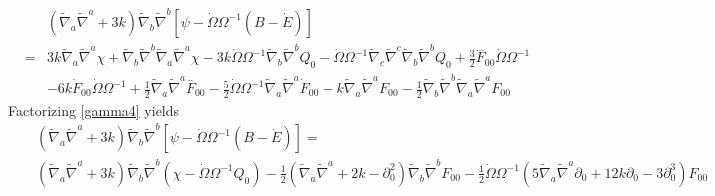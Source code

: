 \documentclass[10pt,letterpaper]{article}
\numberwithin{equation}{section}
\begin{document}
\begin{eqnarray}
&&(\tilde\nabla_a\tilde\nabla^a + 3k)\tilde\nabla_b\tilde\nabla^b[ \psi-\dot \Omega \Omega^{-1}(B-\dot E)]
\nonumber\\
&=& 3 k \tilde{\nabla}_{a}\tilde{\nabla}^{a}\chi + \tilde{\nabla}_{b}\tilde{\nabla}^{b}\tilde{\nabla}_{a}\tilde{\nabla}^{a}\chi -3 k \dot{\Omega} \Omega^{-1} \tilde{\nabla}_{b}\tilde{\nabla}^{b}Q_0 -  \dot{\Omega} \Omega^{-1} \tilde{\nabla}_{c}\tilde{\nabla}^{c}\tilde{\nabla}_{b}\tilde{\nabla}^{b}Q_0+\tfrac{3}{2} \overset{...}{F}_{00}{} \dot{\Omega} \Omega^{-1} \nonumber \\ 
&& - 6 k \dot{F}_{00}{} \dot{\Omega} \Omega^{-1} + \tfrac{1}{2} \tilde{\nabla}_{a}\tilde{\nabla}^{a}\overset{..}{F}_{00}{} -  \tfrac{5}{2} \dot{\Omega} \Omega^{-1} \tilde{\nabla}_{a}\tilde{\nabla}^{a}\dot{F}_{00}{} -  k \tilde{\nabla}_{a}\tilde{\nabla}^{a}F_{00}{} -  \tfrac{1}{2} \tilde{\nabla}_{b}\tilde{\nabla}^{b}\tilde{\nabla}_{a}\tilde{\nabla}^{a}F_{00}{}
\label{gamma4}
\end{eqnarray}
Factorizing \eqref{gamma4} yields 
\begin{eqnarray}
&&(\tilde\nabla_a\tilde\nabla^a + 3k)\tilde\nabla_b\tilde\nabla^b[ \psi-\dot \Omega \Omega^{-1}(B-\dot E)] =
\nonumber\\
&&(\tilde\nabla_a\tilde\nabla^a + 3k)\tilde\nabla_b\tilde\nabla^b(\chi - \dot\Omega \Omega^{-1} Q_0)
-\tfrac12 \left( \tilde\nabla_a\tilde\nabla^a +2k - \partial_0^2\right) \tilde\nabla_b\tilde\nabla^b F_{00}
-\tfrac12 \dot\Omega\Omega^{-1}\left( 5\tilde\nabla_a\tilde\nabla^a\partial_0 + 12k \partial_0 -3\partial_0^3\right)F_{00}
\nonumber\\
\phantom{}
\end{eqnarray}
\newpage
\end{document}

